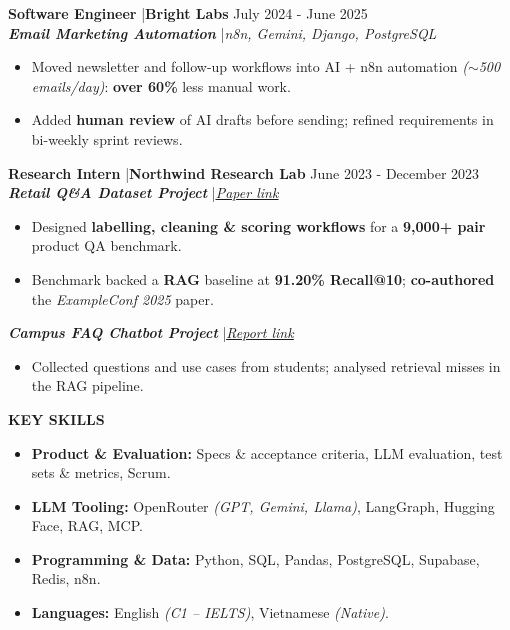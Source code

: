 \documentclass[10pt,a4paper]{article}
\newcommand{\cvsection}[1]{
    \vspace{1ex}
    \noindent\textbf{\large\color{cvblue} \uppercase{#1}} \textcolor{cvblue}{\hrulefill}\par
    \vspace{1ex}
}
\newcommand{\cvproject}[1]{\textcolor{cvblue}{\textbf{\textit{#1}}}}
\begin{document}
\noindent\textbf{Software Engineer} \quad|\quad \textbf{Bright Labs}  \hfill July 2024 - June 2025\\
\vspace{-1mm}%
\cvproject{Email Marketing Automation} \quad|\quad \textit{n8n, Gemini, Django, PostgreSQL}
\begin{itemize}[leftmargin=*, itemsep=0.5mm, parsep=1pt]
    \item Moved newsletter and follow-up workflows into AI + n8n automation \textit{($\sim$500 emails/day)}: \textbf{over 60\%} less manual work.
    \item Added \textbf{human review} of AI drafts before sending; refined requirements in bi-weekly sprint reviews.
\end{itemize}
\vspace{1mm}

\noindent\textbf{Research Intern} \quad|\quad \textbf{Northwind Research Lab} \hfill June 2023 - December 2023\\
\vspace{-1mm}%
\cvproject{Retail Q\&A Dataset Project} \quad|\quad \href{https://doi.org/10.0000/example.0001}{\textit{\underline{Paper link}}}
\begin{itemize}[leftmargin=*, itemsep=0.5mm, parsep=1pt]
    \item Designed \textbf{labelling, cleaning \& scoring workflows} for a \textbf{9,000+ pair} product QA benchmark.
    \item Benchmark backed a \textbf{RAG} baseline at \textbf{91.20\% Recall@10}; \textbf{co-authored} the \textit{ExampleConf 2025} paper.
\end{itemize}
\vspace{-1mm}%
\cvproject{Campus FAQ Chatbot Project} \quad|\quad \href{https://example.com/report}{\textit{\underline{Report link}}}
\begin{itemize}[leftmargin=*, itemsep=0.5mm, parsep=1pt]
    \item Collected questions and use cases from students; analysed retrieval misses in the RAG pipeline.
\end{itemize}

\cvsection{Key Skills}
\vspace{-3mm}
\begin{itemize}[leftmargin=*, itemsep=0.5mm, parsep=1pt]
    \item \textbf{Product \& Evaluation:} Specs \& acceptance criteria, LLM evaluation, test sets \& metrics, Scrum.
    \item \textbf{LLM Tooling:} OpenRouter \textit{(GPT, Gemini, Llama)}, LangGraph, Hugging Face, RAG, MCP.
    \item \textbf{Programming \& Data:} Python, SQL, Pandas, PostgreSQL, Supabase, Redis, n8n.
    \item \textbf{Languages:} English \textit{(C1 -- IELTS)}, Vietnamese \textit{(Native)}.
\end{itemize}
\end{document}
